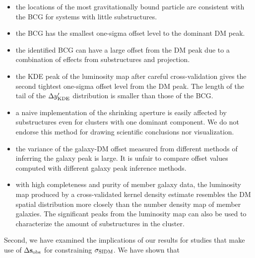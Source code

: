 \begin{itemize}
		\item the locations of the most gravitationally bound particle are consistent 
				with the BCG for systems with little substructures.  \\

		\item the BCG has the smallest one-sigma offset level to the dominant DM
			peak.\\

		\item the identified BCG can have a large offset from the DM peak due to a
			combination of effects from substructures and projection. \\

		\item the KDE peak of the luminosity map after careful cross-validation 
			gives the second tightest one-sigma offset level from the DM peak.  
			The length of the tail of the $\Delta y_{\rm KDE}'$ distribution 
			is smaller than those of the BCG.
			\\

		\item a naive implementation of the shrinking aperture is easily affected 
			by substructures even for clusters with one
			dominant component. We do not endorse this method for drawing scientific
			conclusions nor visualization.\\  

		\item the variance of the galaxy-DM offset measured from different methods
			of inferring the galaxy peak is large. It is unfair to compare
			offset values computed with different galaxy peak inference methods.\\

		\item with high completeness and purity of member galaxy data, the
			luminosity map produced by a cross-validated kernel density estimate 
			resembles the DM spatial distribution more closely than 
			the number density map of member galaxies. The significant peaks from the 
			luminosity map can also be used to characterize the amount of substructures in
			the cluster.\\ 
\end{itemize}
Second, we have examined the implications of our results for studies that make use of
$\Delta {\bf s}_{\rm obs}$ for constraining $\sigma_{\rm SIDM}$. We have shown that 
